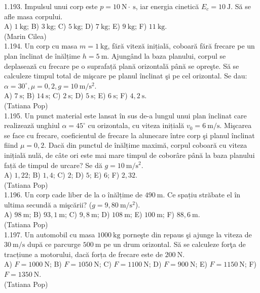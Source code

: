 1.193. Impulsul unui corp este $p=10 \mathrm{~N} \cdot \mathrm{~s}$, iar energia cinetică $E_{c}=10 \mathrm{~J}$. Să se afle masa corpului.\\ A) $1 \mathrm{~kg}$; B) $3 \mathrm{~kg}$; C) $5 \mathrm{~kg}$; D) $7 \mathrm{~kg}$; E) $9 \mathrm{~kg}$; F) $11 \mathrm{~kg}$.\\ (Marin Cilea)\\

1.194. Un corp cu masa $m=1 \mathrm{~kg}$, fără viteză inițială, coboară fără frecare pe un plan înclinat de înălțime $h=5 \mathrm{~m}$. Ajungând la baza planului, corpul se deplasează cu frecare pe o suprafață plană orizontală până se opreşte. Să se calculeze timpul total de mişcare pe planul înclinat şi pe cel orizontal. Se dau: $\alpha=30^{\circ}, \mu=0,2, g=10 \mathrm{~m} / \mathrm{s}^{2}$.\\ A) $7\mathrm{~s}$; B) $14 \mathrm{~s}$; C) $2 \mathrm{~s}$; D) $5 \mathrm{~s}$; E) $6 \mathrm{~s}$; F) $4,2 \mathrm{~s}$.\\ (Tatiana Pop)\\

1.195. Un punct material este lansat în sus de-a lungul unui plan înclinat care realizează unghiul $\alpha=45^{\circ}$ cu orizontala, cu viteza inițială $v_{0}=6 \mathrm{~m} / \mathrm{s}$. Mişcarea se face cu frecare, coeficientul de frecare la alunecare între corp şi planul înclinat fiind $\mu=0,2$. Dacă din punctul de înălțime maximă, corpul coboară cu viteza inițială nulă, de câte ori este mai mare timpul de coborâre până la baza planului față de timpul de urcare? Se dă $g=10 \mathrm{~m} / \mathrm{s}^{2}$. \\ A) $1,22$; B) $1,4$; C) $2$; D) $5$; E) $6$; F) $2,32$.\\ (Tatiana Pop)\\

1.196. Un corp cade liber de la o înălțime de $490 \mathrm{~m}$. Ce spațiu străbate el în ultima secundă a mişcării? ($g=9,80 \mathrm{~m} / \mathrm{s}^{2}$).\\ A) $98 \mathrm{~m}$; B) $93,1 \mathrm{~m}$; C) $9,8 \mathrm{~m}$; D) $108 \mathrm{~m}$; E) $100 \mathrm{~m}$; F) $88,6 \mathrm{~m}$.\\ (Tatiana Pop)\\

1.197. Un automobil cu masa $1000 \mathrm{~kg}$ porneşte din repaus şi ajunge la viteza de $30 \mathrm{~m} / \mathrm{s}$ după ce parcurge $500 \mathrm{~m}$ pe un drum orizontal. Să se calculeze forţa de tracțiune a motorului, dacă forța de frecare este de $200 \mathrm{~N}$.\\ A) $F=1000 \mathrm{~N}$; B) $F=1050 \mathrm{~N}$; C) $F=1100 \mathrm{~N}$; D) $F=900 \mathrm{~N}$; E) $F=1150 \mathrm{~N}$; F) $F=1350 \mathrm{~N}$.\\ (Tatiana Pop)\\


